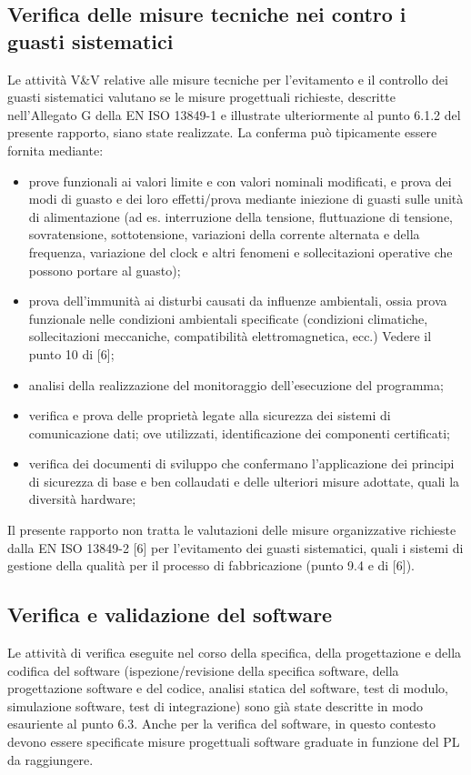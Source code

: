 \subsection{Verifica delle misure tecniche nei contro i guasti sistematici}
\label{subsec:07-4-5}
Le attività V\&V relative alle misure tecniche per l'evitamento e il controllo dei guasti sistematici valutano se le misure progettuali richieste, descritte nell'Allegato G della EN ISO 13849-1 e illustrate ulteriormente al punto 6.1.2 del presente rapporto, siano state realizzate. La conferma può tipicamente essere fornita mediante:
\begin{itemize}
    \item prove funzionali ai valori limite e con valori nominali modificati, e prova dei modi di guasto e dei loro effetti/prova mediante iniezione di guasti sulle unità di alimentazione (ad es. interruzione della tensione, fluttuazione di tensione, sovratensione, sottotensione, variazioni della corrente alternata e della frequenza, variazione del clock e altri fenomeni e sollecitazioni operative che possono portare al guasto);
    \item prova dell'immunità ai disturbi causati da influenze ambientali, ossia prova funzionale nelle condizioni ambientali specificate (condizioni climatiche, sollecitazioni meccaniche, compatibilità elettromagnetica, ecc.) Vedere il punto 10 di [6];
    \item analisi della realizzazione del monitoraggio dell'esecuzione del programma;
    \item verifica e prova delle proprietà legate alla sicurezza dei sistemi di comunicazione dati; ove utilizzati, identificazione dei componenti certificati;
    \item verifica dei documenti di sviluppo che confermano l'applicazione dei principi di sicurezza di base e ben collaudati e delle ulteriori misure adottate, quali la diversità hardware;
\end{itemize}

Il presente rapporto non tratta le valutazioni delle misure organizzative richieste dalla EN ISO 13849-2 [6] per l'evitamento dei guasti sistematici, quali i sistemi di gestione della qualità per il processo di fabbricazione (punto 9.4 e di [6]).

\subsection{Verifica e validazione del software}
\label{subsec:07-4-6}
Le attività di verifica eseguite nel corso della specifica, della progettazione e della codifica del software (ispezione/revisione della specifica software, della progettazione software e del codice, analisi statica del software, test di modulo, simulazione software, test di integrazione) sono già state descritte in modo esauriente al punto 6.3. Anche per la verifica del software, in questo contesto devono essere specificate misure progettuali software graduate in funzione del PL da raggiungere.

